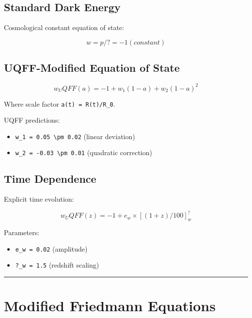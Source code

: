 \documentclass[12pt,a4paper]{article}
\begin{document}
\subsection{Standard Dark Energy}

Cosmological constant equation of state:

\begin{equation}
w = p/? = -1 (constant)
\end{equation}

\subsection{UQFF-Modified Equation of State}

\begin{equation}
w_UQFF(a) = -1 + w_1 (1-a) + w_2 (1-a)^2
\end{equation}

Where scale factor \texttt{a(t) = R(t)/R\_0}.

UQFF predictions:

\begin{itemize}
  \item \texttt{w\_1 = 0.05 \textbackslash pm 0.02} (linear deviation)
  \item \texttt{w\_2 = -0.03 \textbackslash pm 0.01} (quadratic correction)
\end{itemize}

\subsection{Time Dependence}

Explicit time evolution:

\begin{equation}
w_UQFF(z) = -1 + e_w \times [(1+z)/100]^?_w
\end{equation}

Parameters:

\begin{itemize}
  \item \texttt{e\_w = 0.02} (amplitude)
  \item \texttt{?\_w = 1.5} (redshift scaling)
\end{itemize}

\medskip\hrule\medskip

\section{Modified Friedmann Equations}
\end{document}
